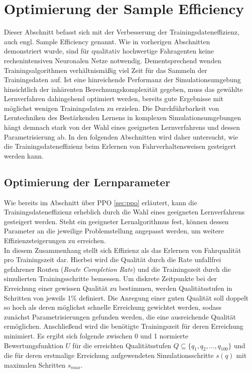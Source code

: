 
\section{Optimierung der Sample Efficiency}\label{sec:SampleEff}

Dieser Abschnitt befasst sich mit der Verbesserung der Trainingsdateneffizienz,
auch engl. Sample Efficiency genannt. Wie in vorherigen Abschnitten demonstriert wurde,
sind für qualitativ hochwertige Fahragenten keine rechenintensiven Neuronalen Netze
notwendig. Dementsprechend wenden Trainingsalgorithmen verhältnismäßig viel Zeit für
das Sammeln der Trainingsdaten auf. Ist eine hinreichende Performanz der Simulationsumgebung
hinsichtlich der inhärenten Berechnungskomplexität gegeben, muss das gewählte Lernverfahren
dahingehend optimiert werden, bereits gute Ergebnisse mit möglichst wenigen Trainingsdaten
zu erzielen. Die Durchführbarkeit von Lerntechniken des Bestärkenden Lernens in komplexen
Simulationsumgebungen hängt demnach stark von der Wahl eines geeigneten Lernverfahrens und
dessen Parametrisierung ab. In den folgenden Abschnitten wird daher untersucht,
wie die Trainingsdateneffizienz beim Erlernen von Fahrverhaltensweisen gesteigert werden kann.

\subsection{Optimierung der Lernparameter}
Wie bereits im Abschnitt über PPO \ref{sec:ppo} erläutert, kann die Trainingsdateneffizienz
erheblich durch die Wahl eines geeigneten Lernverfahrens gesteigert werden. Steht ein
geeigneter Lernalgorithmus fest, können dessen Parameter an die jeweilige Problemstellung
angepasst werden, um weitere Effizienzsteigerungen zu erreichen.\\

In diesem Zusammenhang stellt sich Effizienz als das Erlernen von Fahrqualität
pro Trainingszeit dar. Hierbei wird die Qualität durch die Rate unfallfrei gefahrener
Routen (\emph{Route Completion Rate}) und die Trainingszeit durch die simulierten
Trainingsschritte bemessen. Um diskrete Zeitpunkte bei der Erreichung einer gewissen
Qualität zu bestimmen, werden Qualitätsstufen in Schritten von jeweils 1\% definiert.
Die Anregung einer guten Qualität soll doppelt so hoch als deren möglichst schnelle
Erreichung gewichtet werden, sodass zunächst Parametrisierungen gefunden werden, die
eine ausreichende Qualität ermöglichen. Anschließend wird die benötigte Trainingszeit
für deren Erreichung minimiert. Es ergibt sich folgende zwischen 0 und 1 normierte
Bewertungsfunktion $U$ für die erreichten Qualitätsstufen
$Q \subseteq \{q_1, q_2, ..., q_{100}\}$ und die für deren erstmalige Erreichung
aufgewendeten Simulationsschritte $s(q)$ mit maximalen Schritten $s_{max}$.

